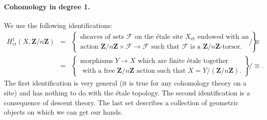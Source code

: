 \paragraph{Cohomology in degree 1.} We use the following identifications:
\begin{eqnarray*}
H_{et}^1 (X, \mathbf{Z}/n\mathbf{Z}) & = & \left\{
\begin{array}{c}
\text{sheaves of sets $\mathcal{F}$ on the \'etale site $X_{\text{\'et}}$ endowed with an} \\
\text{action $\mathbf{Z}/n\mathbf{Z} \times \mathcal{F} \to \mathcal{F}$ such that $\mathcal{F}$ is a $\mathbf{Z}/n\mathbf{Z}$-torsor.}
\end{array}
\right\}
\Big/ \cong 
\\
& = & \left\{
\begin{array}{c}
\text{morphisms $Y \to X$ which are finite \'etale together} \\
\text{ with a free $\mathbf{Z}/n\mathbf{Z}$ action such that $X = Y /(\mathbf{Z}/n\mathbf{Z})$.}
\end{array}
\right\}
\Big/ \cong.
\end{eqnarray*}
The first identification is very general (it is true for any cohomology theory on a site) and has nothing to do with the \'etale topology. The second identification is a consequence of descent theory. The last set describes a collection of geometric objects on which we can get our hands.

